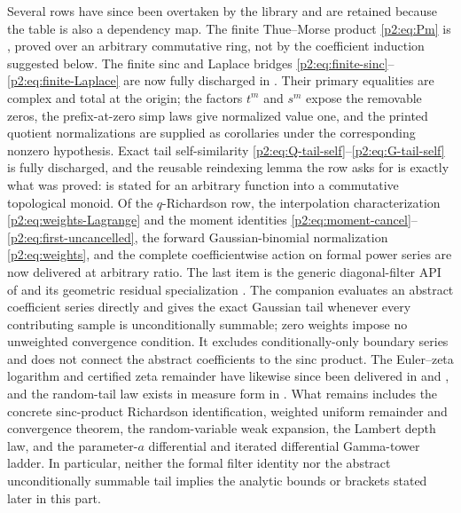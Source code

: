 \documentclass[11pt,oneside]{article}
\numberwithin{equation}{section}
\theoremstyle{definition}
\theoremstyle{remark}
\begin{document}
Several rows have since been overtaken by the library and are retained because
the table is also a dependency map.  The finite Thue--Morse product
\eqref{p2:eq:Pm} is
, proved over an arbitrary commutative
ring, not by the coefficient induction suggested below.  The finite sinc and
Laplace bridges \eqref{p2:eq:finite-sinc}--\eqref{p2:eq:finite-Laplace} are now
fully discharged in .  Their primary
equalities are complex and total at the origin; the factors $t^m$ and $s^m$
expose the removable zeros, the prefix-at-zero simp laws give normalized value
one, and the printed quotient normalizations are supplied as corollaries under
the corresponding nonzero hypothesis.  Exact tail self-similarity
\eqref{p2:eq:Q-tail-self}--\eqref{p2:eq:G-tail-self} is fully discharged, and the reusable
reindexing lemma the row asks for is exactly what was proved:
 is stated for an arbitrary function into a commutative
topological monoid.  Of the $q$-Richardson row, the interpolation characterization
\eqref{p2:eq:weights-Lagrange} and the moment identities
\eqref{p2:eq:moment-cancel}--\eqref{p2:eq:first-uncancelled}, the forward
Gaussian-binomial normalization \eqref{p2:eq:weights}, and the complete
coefficientwise action on formal power series are now delivered at arbitrary
ratio.  The last item is the generic diagonal-filter API of
 and its geometric residual specialization
.  The companion
 evaluates an abstract coefficient series
directly and gives the exact Gaussian tail whenever every contributing sample
is unconditionally summable; zero weights impose no unweighted convergence
condition.  It excludes conditionally-only boundary series and does not connect
the abstract coefficients to the sinc product.  The Euler--zeta logarithm and certified zeta remainder
have likewise since been delivered in  and
, and the random-tail law exists in measure form in
.  What remains includes the concrete sinc-product
Richardson identification, weighted uniform remainder and convergence theorem,
the random-variable weak expansion, the Lambert depth law, and the
parameter-\(a\) differential and iterated differential Gamma-tower ladder.
In particular, neither the formal filter identity
nor the abstract unconditionally summable tail implies the analytic bounds or
brackets stated later in this part.
\end{document}

